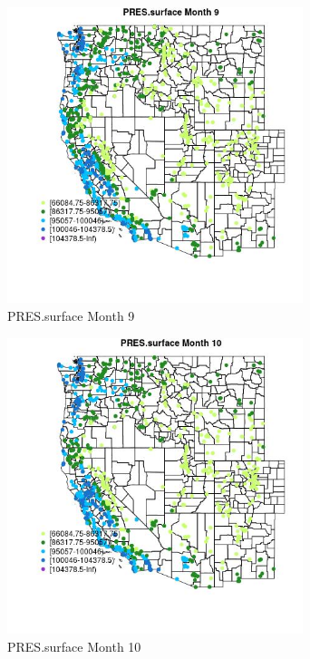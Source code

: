 \begin{figure} 
\centering  
\includegraphics[width=0.77\textwidth]{Code_Outputs/Report_ML_input_PM25_Step4_part_f_de_duplicated_aves_prioritize_24hr_obswNAs_MapObsMo9PRESsurface.jpg} 
\caption{\label{fig:Report_ML_input_PM25_Step4_part_f_de_duplicated_aves_prioritize_24hr_obswNAsMapObsMo9PRESsurface}PRES.surface Month 9} 
\end{figure} 
 

\clearpage 

\begin{figure} 
\centering  
\includegraphics[width=0.77\textwidth]{Code_Outputs/Report_ML_input_PM25_Step4_part_f_de_duplicated_aves_prioritize_24hr_obswNAs_MapObsMo10PRESsurface.jpg} 
\caption{\label{fig:Report_ML_input_PM25_Step4_part_f_de_duplicated_aves_prioritize_24hr_obswNAsMapObsMo10PRESsurface}PRES.surface Month 10} 
\end{figure} 
 

